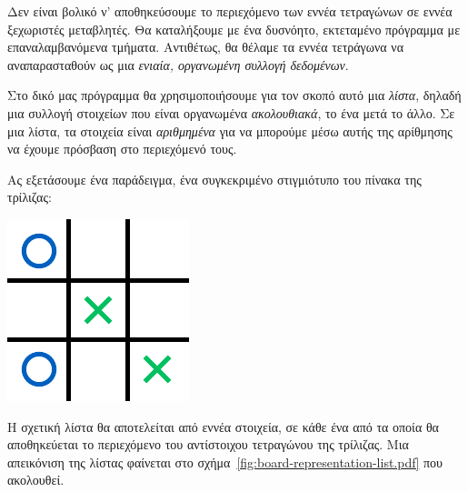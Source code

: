 \documentclass[a4paper,11pt,oneside]{book}
\begin{document}
\clearpage
Δεν είναι βολικό ν' αποθηκεύσουμε το περιεχόμενο των εννέα τετραγώνων σε εννέα ξεχωριστές μεταβλητές. Θα καταλήξουμε με ένα δυσνόητο, εκτεταμένο πρόγραμμα με επαναλαμβανόμενα τμήματα. 
Αντιθέτως, θα θέλαμε τα εννέα τετράγωνα να αναπαρασταθούν ως μια \emph{ενιαία, οργανωμένη συλλογή δεδομένων}.

Στο δικό μας πρόγραμμα θα χρησιμοποιήσουμε για τον σκοπό αυτό μια \emph{λίστα}, δηλαδή μια συλλογή στοιχείων που είναι οργανωμένα \emph{ακολουθιακά}, το ένα μετά το άλλο. Σε μια λίστα, τα στοιχεία είναι \emph{αριθμημένα} για να μπορούμε μέσω αυτής της αρίθμησης να έχουμε πρόσβαση στο περιεχόμενό τους.

Ας εξετάσουμε ένα παράδειγμα, ένα συγκεκριμένο στιγμιότυπο του πίνακα της τρίλιζας:

\vspace{-8pt}\begin{center}
\includegraphics[scale=\scaling]{illustrations/board-example.pdf}
\end{center}\vspace{-\parskip}

Η σχετική λίστα θα αποτελείται από εννέα στοιχεία, σε κάθε ένα από τα οποία θα αποθηκεύεται το περιεχόμενο του αντίστοιχου τετραγώνου της τρίλιζας. Μια απεικόνιση της λίστας φαίνεται στο σχήμα~\ref{fig:board-representation-list.pdf} που ακολουθεί.
    
\end{document}

